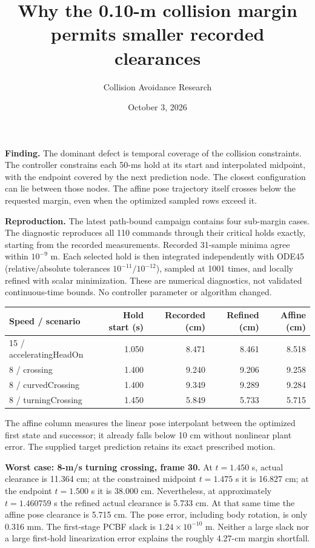 \documentclass[10pt]{article}
\title{Why the 0.10-m collision margin permits smaller recorded clearances}
\author{Collision Avoidance Research}
\date{October 3, 2026}
\begin{document}
\maketitle
\textbf{Finding.} The dominant defect is temporal coverage of the collision constraints.
The controller constrains each 50-ms hold at its start and interpolated midpoint,
with the endpoint covered by the next prediction node. The closest configuration
can lie between those nodes. The affine pose trajectory itself crosses below the
requested margin, even when the optimized sampled rows exceed it.

\textbf{Reproduction.} The latest path-bound campaign contains four sub-margin cases.
The diagnostic reproduces all 110 commands through their critical holds exactly,
starting from the recorded measurements. Recorded 31-sample minima agree within
$10^{-9}$ m. Each selected hold is then integrated independently with ODE45
(relative/absolute tolerances $10^{-11}/10^{-12}$), sampled at 1001 times, and
locally refined with scalar minimization. These are numerical diagnostics, not
validated continuous-time bounds. No controller parameter or algorithm changed.

\begin{center}
\begin{tabular}{lrrrr}
\toprule
Speed / scenario & Hold start (s) & Recorded (cm) & Refined (cm) & Affine (cm) \\
\midrule
15 / acceleratingHeadOn & 1.050 & 8.471 & 8.461 & 8.518 \\
8 / crossing & 1.400 & 9.240 & 9.206 & 9.258 \\
8 / curvedCrossing & 1.400 & 9.349 & 9.289 & 9.284 \\
8 / turningCrossing & 1.450 & 5.849 & 5.733 & 5.715 \\
\bottomrule
\end{tabular}
\end{center}
The affine column measures the linear pose interpolant between the optimized
first state and successor; it already falls below 10 cm without nonlinear plant
error. The supplied target prediction retains its exact prescribed motion.

\textbf{Worst case: 8-m/s turning crossing, frame 30.}
At $t=1.450$ s, actual clearance is 11.364 cm; at the constrained midpoint
$t=1.475$ s it is 16.827 cm; at the endpoint $t=1.500$ s it is 38.000 cm.
Nevertheless, at approximately $t=1.460759$ s the refined actual clearance is
5.733 cm. At that same time the affine pose clearance is 5.715 cm. The pose
error, including body rotation, is only 0.316 mm. The first-stage PCBF slack
is $1.24\times10^{-10}$ m. Neither a large slack nor a large first-hold
linearization error explains the roughly 4.27-cm margin shortfall.
\end{document}
